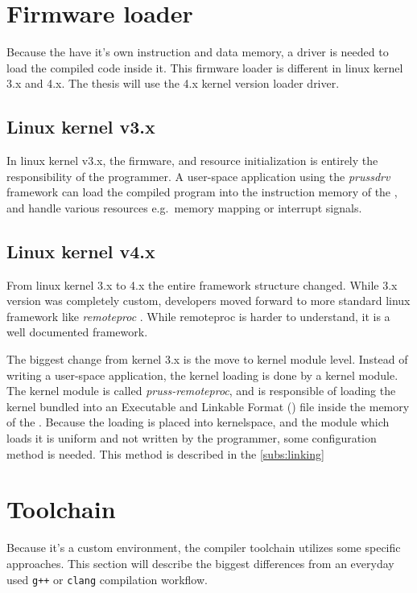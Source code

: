 \section{Firmware loader}

Because the \pru{} have it's own instruction and data memory, a driver is needed to load the compiled code inside it. This firmware loader is different in linux kernel 3.x and 4.x. The thesis will use the 4.x kernel version loader driver.

\subsection{Linux kernel v3.x}

In linux kernel v3.x, the firmware, and resource initialization is entirely the responsibility of the programmer. A user-space application using the \emph{prussdrv} \citep{PRU_PRUSSDRV} framework can load the compiled program into the instruction memory of the \pru, and handle various resources e.g.\ memory mapping or interrupt signals.

\subsection{Linux kernel v4.x}
\label{subsec:fw_loader_kernel4}

From linux kernel 3.x to 4.x the entire framework structure changed. While 3.x version was completely custom, \ti{} developers moved forward to more standard linux framework like \emph{remoteproc} \citep{RPROC}. While remoteproc is harder to understand, it is a well documented framework.

The biggest change from kernel 3.x is the move to kernel module level. Instead of writing a user-space application, the kernel loading is done by a kernel module. The kernel module is called \emph{pruss-remoteproc}, and is responsible of loading the kernel bundled into an Executable and Linkable Format (\elf{}) file inside the memory of the \pru. Because the loading is placed into kernelspace, and the module which loads it is uniform and not written by the programmer, some configuration method is needed. This method is described in the \cref{subs:linking}

\section{Toolchain}

Because it's a custom environment, the compiler toolchain utilizes some specific approaches. This section will describe the biggest differences from an everyday used \verb/g++/ or \verb/clang/ compilation workflow.

